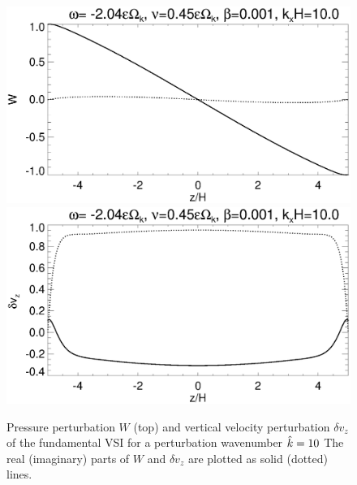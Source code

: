 \begin{figure}
  \includegraphics[width=\linewidth,clip=true,trim=0cm 1.75cm 0cm
  0cm]{figures/eigenvectorW_iso} 
  \includegraphics[width=\linewidth,clip=true,trim=0cm 0cm 0cm
  1cm]{figures/eigenvectorvz_iso}
  \caption{Pressure perturbation $W$ (top) and vertical velocity
    perturbation $\delta v_z$ of the fundamental VSI for a
    perturbation  wavenumber $\hat{k}=10$  The real 
    (imaginary) parts of $W$ and $\delta v_z$ are plotted as solid
    (dotted) lines. 
    \label{lowfreq_eigenfunc}
  }
\end{figure}


